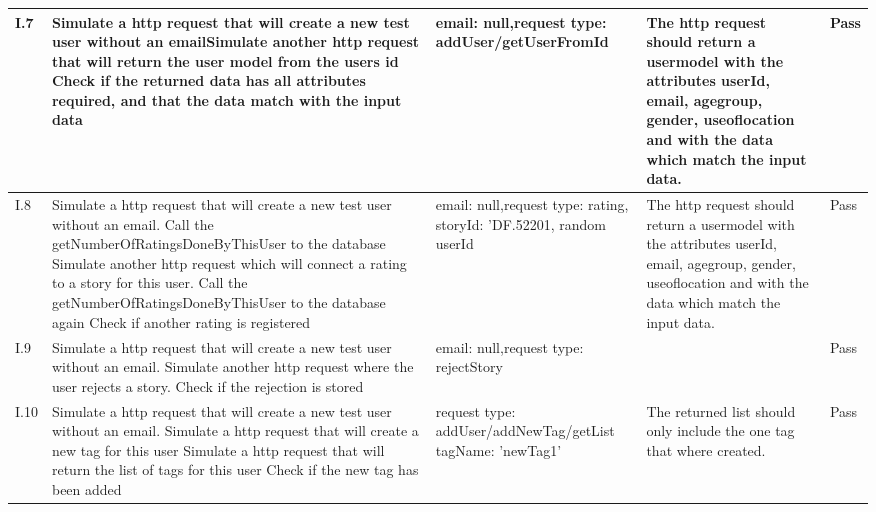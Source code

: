 {\begin{center}
\begin{longtable}{ | p{1cm} | p{5.5cm} | p{4cm} | p{4.5cm} | p{2cm}|}
			I.7 & Simulate a http request that will create a new test user without an email\newline  Simulate another http request that will return the user model from the users id \newline Check if the returned data has all attributes required, and that the data match with the input data & email: null,\newline request type: addUser/getUserFromId  & The http request should return a usermodel with the attributes userId, email, age\textunderscore group, gender, use\textunderscore of\textunderscore location and with the data which match the input data. & Pass\\ \hline
			
			I.8 & Simulate a http request that will create a new test user without an email. \newline Call the getNumberOfRatingsDoneByThisUser to the database \newline  Simulate another http request which will connect a rating to a story for this user.  \newline Call the getNumberOfRatingsDoneByThisUser to the database again \newline Check if another rating is registered & email: null,\newline request type: rating, storyId: 'DF.52201, random userId  & The http request should return a usermodel with the attributes userId, email, age\textunderscore group, gender, use\textunderscore of\textunderscore location and with the data which match the input data. & Pass \\ \hline
			
			I.9 & Simulate a http request that will create a new test user without an email. \newline  \newline  Simulate another http request where the user rejects a story.  \newline  \newline Check if the rejection is stored & email: null,\newline request type: rejectStory  &  & Pass \\ \hline

			I.10 & Simulate a http request that will create a new test user without an email. \newline  Simulate a http request that will create a new tag for this user \newline Simulate a http request that will return the list of tags for this user \newline Check if the new tag has been added  & request type: addUser/addNewTag/getList  tagName: 'newTag1' & The returned list should only include the one tag that where created.& Pass\\ \hline
			

\end{longtable}
\end{center}}
